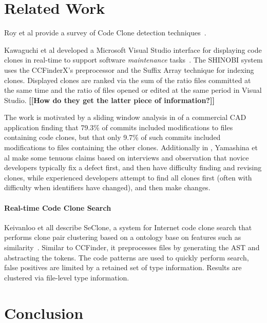 \documentclass[preprint,10pt]{sigplanconf}
\newcommand{\todo}[1]{{\bfseries [[#1]]}}
\begin{document}
\section{Related Work}
\label{sec:related}

Roy et al provide a survey of Code Clone detection
techniques~\cite{Roy2009}.

Kawaguchi et al developed a Microsoft Visual Studio interface for
displaying code clones in real-time to support software
\emph{maintenance} tasks~\cite{Kawaguchi2009,Yamashina2008}. The
SHINOBI system uses the CCFinderX's preprocessor and the Suffix Array
technique for indexing clones. Displayed clones are ranked via the sum
of the ratio files committed at the same time and the ratio of files
opened or edited at the same period in Visual Studio. \todo{How do
  they get the latter piece of information?}

The work is motivated by a sliding window analysis in
\cite{Yamashina2008} of a commercial CAD application finding that
79.3\% of commits included modifications to files containing code
clones, but that only 9.7\% of such commits included modifications to
files containing the other clones. Additionally in
\cite{Yamashina2008}, Yamashina et al make some tenuous claims based
on interviews and observation that novice developers typically fix a
defect first, and then have difficulty finding and revising clones,
while experienced developers attempt to find all clones first (often
with difficulty when identifiers have changed), and then make changes.

\paragraph{Real-time Code Clone Search}

Keivanloo et all describe SeClone, a system for Internet code clone
search that performs clone pair clustering based on a ontology base on
features such as similarity~\cite{Keivanloo2011}. Similar to CCFinder,
it preprocesses files by generating the AST and abstracting the
tokens. The code patterns are used to quickly perform search, false
positives are limited by a retained set of type information. Results
are clustered via file-level type information.




\section{Conclusion}
\end{document}
